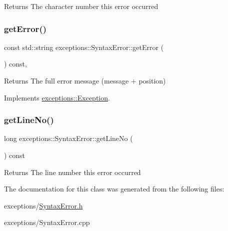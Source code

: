 \begin{DoxyReturn}{Returns}
The character number this error occurred 
\end{DoxyReturn}
\mbox{\label{classexceptions_1_1SyntaxError_a76804893bdba149c9dc7df4f26be31e0}} 
\subsubsection{\texorpdfstring{get\+Error()}{getError()}}
{\footnotesize\ttfamily const std\+::string exceptions\+::\+Syntax\+Error\+::get\+Error (\begin{DoxyParamCaption}{ }\end{DoxyParamCaption}) const\hspace{0.3cm}{\ttfamily [override]}, {\ttfamily [virtual]}}

\begin{DoxyReturn}{Returns}
The full error message (message + position) 
\end{DoxyReturn}


Implements \hyperlink{classexceptions_1_1Exception}{exceptions\+::\+Exception}.

\mbox{\label{classexceptions_1_1SyntaxError_a250a5032a546390f979c3ff624a88ead}} 
\subsubsection{\texorpdfstring{get\+Line\+No()}{getLineNo()}}
{\footnotesize\ttfamily long exceptions\+::\+Syntax\+Error\+::get\+Line\+No (\begin{DoxyParamCaption}{ }\end{DoxyParamCaption}) const}

\begin{DoxyReturn}{Returns}
The line number this error occurred 
\end{DoxyReturn}


The documentation for this class was generated from the following files\+:\begin{DoxyCompactItemize}
\item 
exceptions/\hyperlink{SyntaxError_8h}{Syntax\+Error.\+h}\item 
exceptions/Syntax\+Error.\+cpp\end{DoxyCompactItemize}
